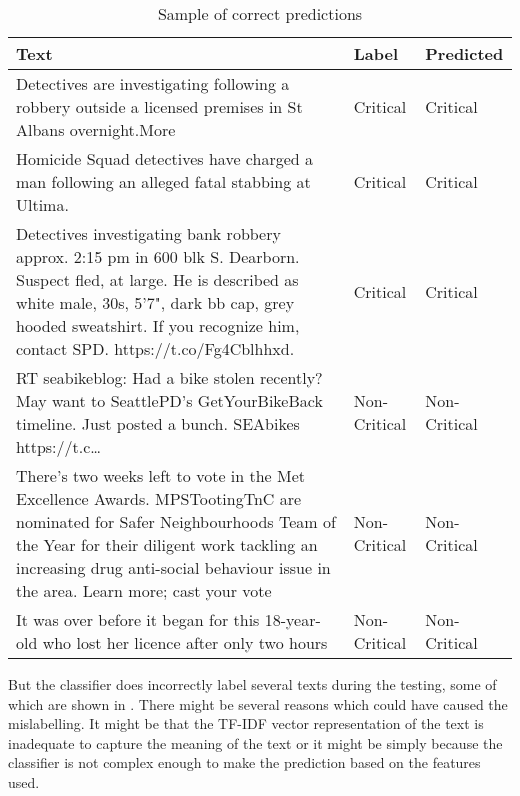 \begin{table}
\begin{center}
\caption{Sample of correct predictions}
\label{tbl:correct_predictions}
\begin{tabular}{p{10cm}p{2cm}p{2cm}}
\toprule 
Text&Label&Predicted\\
\midrule 
Detectives are investigating following a robbery outside a licensed premises in St Albans overnight.More &Critical&Critical\\
\hline
Homicide Squad detectives have charged a man following an alleged fatal stabbing at Ultima.&Critical&Critical\\
\hline
Detectives investigating bank robbery approx. 2:15 pm in 600 blk S. Dearborn.  Suspect fled, at large. He is described as white male, 30s, 5'7", dark bb cap, grey hooded sweatshirt. If you recognize him, contact SPD. https://t.co/Fg4Cblhhxd.&Critical&Critical\\
\hline
RT seabikeblog: Had a bike stolen recently? May want to SeattlePD’s GetYourBikeBack timeline. Just posted a bunch. SEAbikes https://t.c…
&Non-Critical&Non-Critical\\
\hline
There's two weeks left to vote in the Met Excellence Awards. MPSTootingTnC are nominated for Safer Neighbourhoods Team of the Year for their diligent work tackling an increasing drug anti-social behaviour issue in the area. Learn more; cast your vote&Non-Critical&Non-Critical\\
\hline
It was over before it began for this 18-year-old who lost her licence after only two hours&Non-Critical&Non-Critical\\
\bottomrule
\end{tabular}
\end{center}
\end{table}

But the classifier does incorrectly label several texts during the testing, some of which are shown in . There might be several reasons which could have caused the mislabelling. It might be that the TF-IDF vector representation of the text is inadequate to capture the meaning of the text or it might be simply because the classifier is not complex enough to make the prediction based on the features used.

